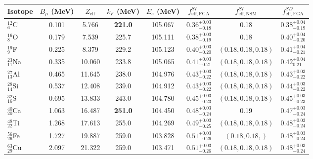 \documentclass{book}[letterpaper,12pt]
\begin{document}
\begin{table}
\centering
\begin{tabular}{lccccccc}
\hline
\hline
Isotope & $B_{\mu}$ (MeV) & $Z_\mathrm{eff}$ & $k_F$ (MeV) & $E_e$ (MeV) & $f_\mathrm{eff,FGA}^{SI}$ & $f_\mathrm{eff,NSM}^{SI}$ & $f_\mathrm{eff,FGA}^{SD}$\\
\hline
$^{12}_6$C & 0.101 & 5.766 & \textbf{221.0} & 105.067 & $0.36^{+0.03}_{-0.18}$ & 0.18 & $0.38^{+0.04}_{-0.19}$\\
$^{16}_8$O & 0.179 & 7.539 & 225.7 & 105.111 & $0.38^{+0.03}_{-0.19}$ & 0.18 & $0.40^{+0.04}_{-0.20}$\\
$^{19}_9$F & 0.225 & 8.379 & 229.2 & 105.123 & $0.40^{+0.03}_{-0.20}$ & $(0.18,0.18,0.18)$ & $0.41^{+0.04}_{-0.21}$\\
$^{23}_{11}$Na & 0.335 & 10.060 & 233.8 & 105.065 & $0.41^{+0.03}_{-0.21}$ & $(0.18,0.18,0.18)$ & $0.42^{+0.04}_{0.21}$ \\
$^{27}_{13}$Al & 0.465 & 11.645 & 238.0 & 104.976 & $0.43^{+0.03}_{-0.22}$ & $(0.18, 0.18, 0.18)$ & $0.43^{+0.03}_{-0.22}$\\
$^{28}_{14}$Si & 0.537 & 12.408 & 239.0 & 104.912 & $0.43^{+0.03}_{-0.22}$ & $(0.18, 0.18, 0.18)$ & $0.44^{+0.03}_{-0.22}$ \\
$^{32}_{16}$S & 0.695 & 13.833 & 243.0 & 104.780 & $0.45^{+0.03}_{-0.23}$ & $(0.18,0.18,0.18)$ & $0.45^{+0.03}_{-0.23}$ \\
$^{40}_{20}$Ca & 1.063 & 16.487 & \textbf{251.0} & 104.450 & $0.48^{+0.03}_{-0.24}$ & 0.19 & $0.47^{+0.03}_{-0.24}$\\
$^{48}_{22}$Ti & 1.268 & 17.613 & 255.0 & 104.269 & $0.49^{+0.03}_{-0.25}$ & $(0.18,0.18,0.18)$ & $0.48^{+0.03}_{-0.24}$\\
$^{56}_{26}$Fe & 1.727 & 19.887 & 259.0 & 103.828 & $0.51^{+0.03}_{-0.26}$ & $(0.18,0.18, )$ & $0.48^{+0.03}_{-0.24}$ \\
$^{63}_{29}$Cu & 2.097 & 21.322 & 259.0 & 103.471 & $0.51^{+0.03}_{-0.26}$ & $(0.18, 0.18, 0.18)$ & $0.48^{+0.03}_{-0.24}$\\
\hline\hline
\end{tabular}

\end{table}
\end{document}
